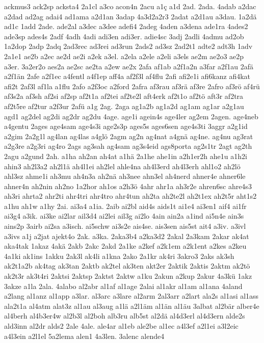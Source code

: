{ackmus3
ack2sp
acksta4
2a1cl
a3co
acon4n
2acu
a1ç
a1d
2ad.
2ada.
4adab
a2dac
a2dad
ad2ag
adai4
ad1ama
a2d1an
3adap
4a3d2a2r3
2adat
a2d1au
a3dau.
1a2dä
ad1c
1add
2ade.
ade2al
a3dec
a3dee
adefi4
2adeg
4aden
a3dena
ade1ra
4ades2
ade3sp
ades4s
2adf
4adh
4adi
adi3en
adi3er.
adie4sc
3adj
2adli
4admu
ad2ob
1a2dop
2adp
2adq
2ad3rec
ad3rei
ad3run
2ads2
ad3sz
2ad2t1
adte2
adt3h
1adv
2a1e1
ae2b
a2ec
ae2d
ae2i
a2ek
a3el.
a2ela
a2ele
a2eli
a3els
ae2m
ae2o3
ae2p
a3er.
3a2er2o
aes2a
ae2sc
ae2ta
a2ew
ae2x
2afa
af1ab
a2f1a2n
a3far
a2f1au
2afä
a2f1än
2afe
a2f1ec
a4fentl
a4f1ep
aff4a
af2f3l
af4flu
2afi
afi2e1i
afi6kanz
afi4kat
afi2t
2af3l
af1la
a1flu
2afo
a2f3oc
a2ford
2afra
af3rau
af3rä
af3re
2afro
af3rö
af4rü
af3s2a
af3sh
af2si
af2sp
af2t1a
af2tei
af2te2l
aft4erk
af2t1o
af2tö
aft3r
af2tra
af2t5re
af2tur
a2f3ur
2afü
a1g
2ag.
2aga
ag1a2b
ag1a2d
ag1am
ag1ar
a2g1au
agd1
ag2del
ag2di
ag2dr
ag2du
4age.
age1i
agein4s
age4ler
ag2em
2agen.
age4neb
a4gentu
2ages
age4sam
age4s3i
age2s3p
ages5s
ages6sen
age4s3ti
3aggr
a2g1id
a2gim
2a2g1l
ag4lan
ag4las
a4glö
2agm
ag2n
ag4nat
a4gnä
ag4ne.
ag4nu
ag3rat
a2g3re
a2g3ri
ag4ro
2ags
ag3sah
ag4sam
ag3s4eid
ags8porta
ag2s1tr
2agt
ag2th
2agu
a2gund
2ah.
a1ha
ah2an
ah4at
a1hä
2a1he
ahe1in
a2h1er2h
ahe1u
a1h2i
ahin3
ah2l3a2
ah2l1ä
ah4l1ei
ah2lel
ahle4na
ah4l3erd
ah4l3erh
ahl1o2
ah2lö
ahl3sz
ahme1i
ah3mu
ah4n3a
ah2nä
ah3nee
ahn3el
ah4nerd
ahner4e
ahner6le
ahner4n
ah2nin
ah2no
1a2hor
ah1os
a2h3ö
4ahr
ahr1a
ah3r2e
ahren6sc
ahre4s3
ah3ri
ahrta2
ahr2ti
ahr4tri
ahr4tro
ahr4tun
ah2ta
ah2te2l
ah2t1ex
ah2t5r
aht1s2
a1hu
ah1w
a1hy
2ai.
ai3a4
a1ia.
2aib
ai2bl
aid4s
aids1t
ai1e4
ai3en1
aif4
ai1fr
ai3g4
a3ik.
ai3ke
ai2lar
ail3d4
ai2lei
ail3g
ai2lo
4ain
ain2a
a1ind
ai5n4e
ain3s
ains2p
3airb
ai2sa
a3isch.
ai5schw
ai3s2e
ais4se.
ais3sen
ais5st
ait4
a3iv.
a3ivl
a3ivs
a1j
a2jat
ajekt4o
2ak.
a3ka.
2aka3b4
a2ka3d2
2akal
2a3kam
2akar
ak4at
aka4tak
1akaz
4akä
2akb
2akc
2akd
2a1ke
a2kef
a2k1em
a2k1ent
a2kes
a2keu
4a1ki
ak1ins
1akku
2ak3l
ak4li
a1kna
2ako
2a1kr
ak4ri
3akro3
2aks
ak3sh
ak2t1a2b
ak4tag
ak3tan
2aktb
ak2tel
ak3ten
akt2er
2aktik
2aktis
2aktm
ak2tö
ak2t3r
ak3t4ri
2aktsi
2aktsp
2aktst
2aktw
a1ku
2akun
a2kup
2akur
4a3kü
1akz
3akze
a1la
2ala.
4alabo
al2abr
al1af
al1age
2alai
al1akr
al1am
al1ana
4aland
a2lang
al1anz
al1app
a3lar.
al3arc
a3lare
al2arm
2al3arr
a2lart
ala2s
al1asi
al1ass
ala2t1a
al4atm
alat3z
al1au
al3aug
a1lä
a2l1äm
al1än
al1äu
3albat
al2bär
alber4e
al4berh
al4b3er4w
al2b3l
al2boh
alb3ru
alb5st
al2dä
al4d3erl
al4d3ern
alde2s
ald3inn
al2dr
alds2
2ale
4ale.
ale4ar
al1eb
ale2be
al1ec
a4l3ef
a2l1ei
a3l2eic
a4l3ein
a2l1el
5a2lema
alen1
4a3len.
3alenc
alende4
}
